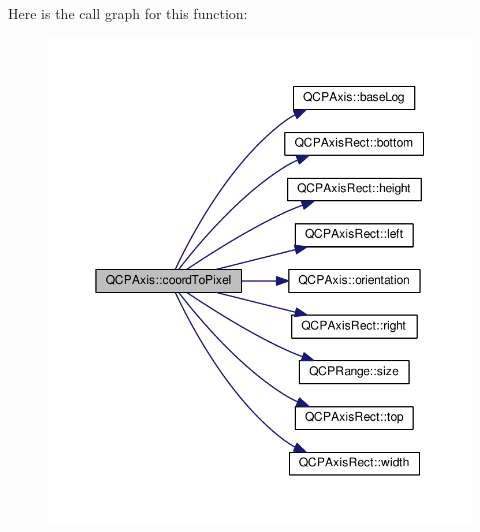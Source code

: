 Here is the call graph for this function\+:\nopagebreak
\begin{figure}[H]
\begin{center}
\leavevmode
\includegraphics[width=350pt]{class_q_c_p_axis_a985ae693b842fb0422b4390fe36d299a_cgraph}
\end{center}
\end{figure}




